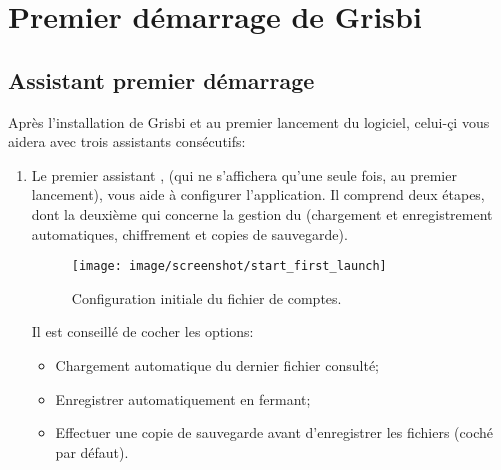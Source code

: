 

\chapter{Premier démarrage de Grisbi\label{start}}


\section{Assistant premier démarrage\label{start-first}}


Après l'installation de Grisbi et au premier lancement du logiciel, celui-çi vous aidera avec trois assistants consécutifs:
\begin{enumerate}
	\item Le premier assistant , (qui ne s'affichera qu'une seule fois, au premier lancement), vous aide à configurer l'application. Il comprend deux étapes, dont la deuxième qui concerne la gestion du  (chargement et enregistrement automatiques, chiffrement et copies de sauvegarde).

\begin{figure}[htbp]
	\begin{center}
		\texttt{[image: image/screenshot/start\_first\_launch]}
	\end{center}
	\caption{Configuration initiale du fichier de comptes.}
	\label{start_first_launch}
\end{figure}

Il est conseillé de cocher les options:
	\begin{itemize}
		\item Chargement automatique du dernier fichier consulté;
		\item Enregistrer automatiquement en fermant;
		\item Effectuer une copie de sauvegarde avant d'enregistrer les fichiers (coché par défaut).
	\end{itemize}
\end{enumerate}

